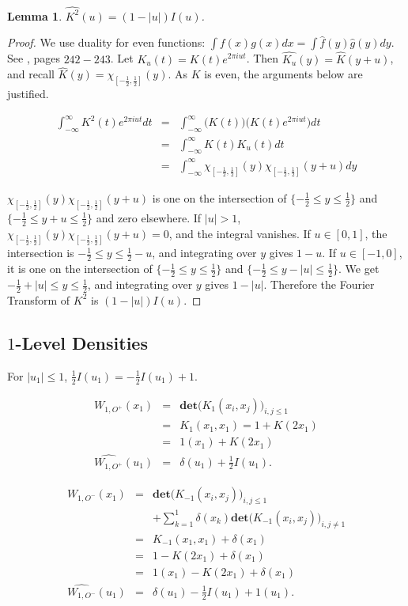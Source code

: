 \documentclass{compositio}
\newcommand\bp{\begin{proof}}
\newcommand\ep{\end{proof}}
\newtheorem{lem}[thm]{Lemma}
\newcommand{\foh}{\frac{1}{2}}  %
\newcommand{\chiint}{\chi_{[-\foh,\foh]}}
\begin{document}
\begin{lem}$\widehat{K^2}(u) = (1 - |u|)I(u)$.
\end{lem}

\bp We use duality for even functions: $\int f(x)g(x)dx = \int
\widehat{f}(y) \widehat{g}(y) dy$. See \cite{La2}, pages
$242-243$. Let $K_{u}(t) = K(t)e^{2\pi i u t}$. Then
$\widehat{K_{u}}(y) = \widehat{K}(y+u)$, and recall
$\widehat{K}(y) = \chiint(y)$. As $K$ is even, the arguments below
are justified.

\begin{eqnarray} \int_{-\infty}^\infty  K^2(t) e^{2 \pi i
ut} dt & = & \int_{-\infty}^\infty  \Big(K(t)\Big) \Big( K(t) e^{2
\pi i ut} \Big) dt \nonumber\\ & = & \int_{-\infty}^\infty K(t)
K_{u}(t) dt \nonumber\\ & = & \int_{-\infty}^\infty \chiint(y)
\chiint(y+u) dy
\end{eqnarray}

$\chiint(y) \chiint(y+u)$ is one on the intersection of $\{-\foh
\leq y \leq \foh\}$ and $\{-\foh \leq y + u \leq \foh\}$ and zero
elsewhere. If $|u|
> 1$, $\chiint(y) \chiint(y+u) = 0$, and the integral vanishes.
If $u \in [0,1]$, the intersection is $-\foh \leq y \leq \foh -
u$, and integrating over $y$ gives $1 - u$. If $u \in [-1,0]$, it
is one on the intersection of $\{-\foh \leq y \leq \foh\}$ and
$\{-\foh \leq y - |u| \leq \foh\}$. We get $-\foh + |u| \leq y
\leq \foh$, and integrating over $y$ gives $1 - |u|$. Therefore
the Fourier Transform of $K^2$ is $(1 - |u|)I(u)$. \ep



\subsection{$1$-Level Densities}

For $|u_1| \leq 1$, $\foh I(u_1) = -\foh I(u_1) + 1$.

\begin{eqnarray}
W_{1,O^+}(x_1) & = & \textbf{det} \Big( K_1(x_i,x_j) \Big)_{i,j
\leq 1} \nonumber\\ & = & K_1(x_1,x_1) = 1 + K(2x_1) \nonumber\\ &
= & 1(x_1) + K(2x_1) \nonumber\\ \widehat{W_{1,O^+} }(u_1) & = &
\delta(u_1) + \foh I(u_1).
\end{eqnarray}

\begin{eqnarray}
W_{1,O^-}(x_1) & = & \textbf{det} \Big( K_{-1}(x_i,x_j) \Big)_{i,j
\leq 1} \nonumber\\ & & + \sum_{k=1}^1 \delta(x_k) \textbf{det}
\Big( K_{-1}(x_i,x_j) \Big)_{i,j \neq 1} \nonumber\\ & = &
K_{-1}(x_1,x_1) + \delta(x_1) \nonumber\\ & = & 1 - K(2x_1) +
\delta(x_1) \nonumber\\ & = & 1(x_1) - K(2x_1) + \delta(x_1)
\nonumber\\ \widehat{W_{1,O^-} }(u_1) & = & \delta(u_1) - \foh
I(u_1) + 1(u_1).
\end{eqnarray}
\end{document}
